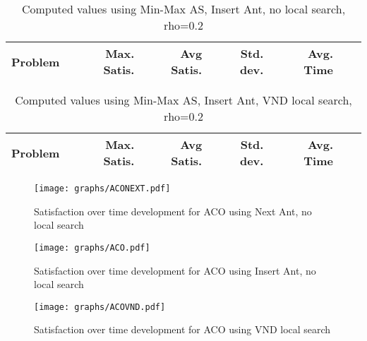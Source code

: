 \documentclass{article}
\begin{document}
\begin{table}
  \caption{Computed values using Min-Max AS, Insert Ant, no local search, rho=0.2}
  \label{tab:conf14}
  \setlength{\tabcolsep}{1.4mm}
  \centering
  \begin{tabular}{lrrrrrr}
    \bfseries Problem &
    \bfseries Max. Satis. &
    \bfseries Avg Satis. &
    \bfseries Std. dev. &
    \bfseries Avg. Time 
    \\\hline
    
    \hline
  \end{tabular}

\end{table}

\begin{table}
  \caption{Computed values using Min-Max AS, Insert Ant, VND local search, rho=0.2}
  \label{tab:conf15}
  \setlength{\tabcolsep}{1.4mm}
  \centering
  \begin{tabular}{lrrrrrr}
    \bfseries Problem & 
    \bfseries Max. Satis. &
    \bfseries Avg Satis. &
    \bfseries Std. dev. &
    \bfseries Avg. Time 
    \\\hline
    
    \hline
  \end{tabular}

\end{table}


\clearpage





\begin{figure}
\centering
\texttt{[image: graphs/ACONEXT.pdf]}
\caption{Satisfaction over time development for ACO using Next Ant, no local search}
\label{fig:ACONEXT}
\end{figure}

\begin{figure}
\centering
\texttt{[image: graphs/ACO.pdf]}
\caption{Satisfaction over time development for ACO using Insert Ant, no local search}
\label{fig:ACO}
\end{figure}

\begin{figure}
\centering
\texttt{[image: graphs/ACOVND.pdf]}
\caption{Satisfaction over time development for ACO using VND local search}
\label{fig:vnd}
\end{figure}
\end{document}
